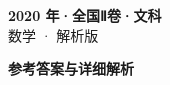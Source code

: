 \documentclass[zihao=-4, a4paper]{ctexart}
\begin{document}
\begin{center}
  {\Large\bfseries 2020 年·全国Ⅱ卷·文科}\\[4pt]
  {\large 数学 · 解析版}
\end{center}
\medskip
{}

\clearpage
{}
\begin{center}{\Large\bfseries 参考答案与详细解析}\end{center}
\medskip

\end{document}
